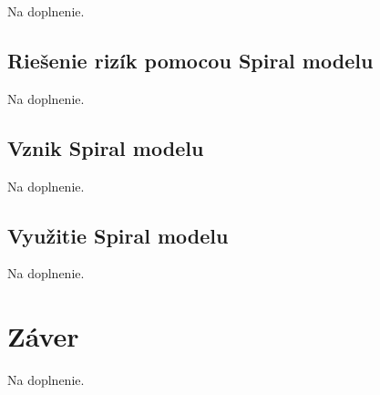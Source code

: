 \documentclass[10pt,twoside,slovak,a4paper]{article}
\begin{document}
Na doplnenie.
\subsection{Riešenie rizík pomocou Spiral modelu} \label{risks:spiralModel}

Na doplnenie.

\subsection{Vznik Spiral modelu} \label{history:spiralModel}

Na doplnenie.

\subsection{Využitie Spiral modelu} \label{usage:spiralModel}

Na doplnenie.








\section{Záver} \label{zaver} %
Na doplnenie.





\end{document}
